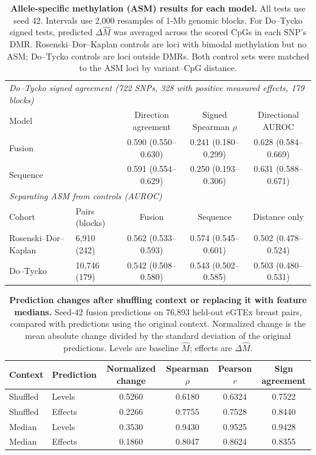 \documentclass[11pt,letterpaper]{article}
\begin{document}
\begin{table}[H]
\centering
\caption{\textbf{Allele-specific methylation (ASM) results for each model.} All tests use seed 42. Intervals use 2,000 resamples of 1-Mb genomic blocks. For Do--Tycko signed tests, predicted $\Delta\widehat M$ was averaged across the scored CpGs in each SNP's DMR. Rosenski--Dor--Kaplan controls are loci with bimodal methylation but no ASM; Do--Tycko controls are loci outside DMRs. Both control sets were matched to the ASM loci by variant--CpG distance.}
\label{tab:s2}
\small
\begin{tabular}{llccc}
\toprule
\multicolumn{5}{l}{\textit{Do--Tycko signed agreement (722 SNPs, 328 with positive measured effects, 179 blocks)}}\\
Model & & Direction agreement & Signed Spearman $\rho$ & Directional AUROC\\
\midrule
Fusion & & 0.590 (0.550--0.630) & 0.241 (0.180--0.299) & 0.628 (0.584--0.669)\\
Sequence & & 0.591 (0.554--0.629) & 0.250 (0.193--0.306) & 0.631 (0.588--0.671)\\
\midrule
\multicolumn{5}{l}{\textit{Separating ASM from controls (AUROC)}}\\
Cohort & Pairs (blocks) & Fusion & Sequence & Distance only\\
\midrule
Rosenski--Dor--Kaplan & 6,910 (242) & 0.562 (0.533--0.593) & 0.574 (0.545--0.601) & 0.502 (0.478--0.524)\\
Do--Tycko & 10,746 (179) & 0.542 (0.508--0.580) & 0.543 (0.502--0.585) & 0.503 (0.480--0.531)\\
\bottomrule
\end{tabular}
\end{table}

\begin{table}[H]
\centering
\caption{\textbf{Prediction changes after shuffling context or replacing it with feature medians.} Seed-42 fusion predictions on 76,893 held-out eGTEx breast pairs, compared with predictions using the original context. Normalized change is the mean absolute change divided by the standard deviation of the original predictions. Levels are baseline $\widehat M$; effects are $\Delta\widehat M$.}
\label{tab:s3}
\small
\begin{tabular}{llcccc}
\toprule
Context & Prediction & Normalized change & Spearman $\rho$ & Pearson $r$ & Sign agreement\\
\midrule
Shuffled & Levels & 0.5260 & 0.6180 & 0.6324 & 0.7522\\
Shuffled & Effects & 0.2266 & 0.7755 & 0.7528 & 0.8440\\
Median & Levels & 0.3530 & 0.9430 & 0.9525 & 0.9428\\
Median & Effects & 0.1860 & 0.8047 & 0.8624 & 0.8355\\
\bottomrule
\end{tabular}
\end{table}
\end{document}
